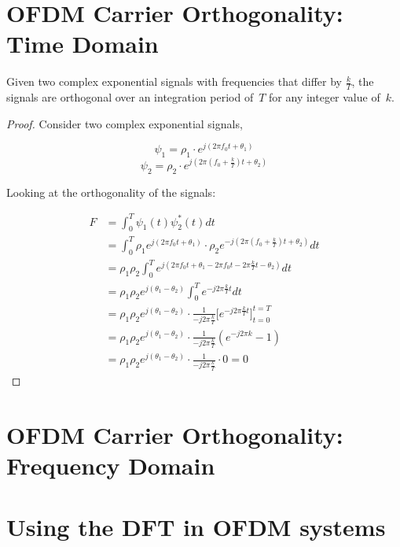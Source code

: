 \documentclass[class=report,11pt,crop=false]{standalone}
\begin{document}
\section{OFDM Carrier Orthogonality: Time Domain \label{sect:proofs_ofdm-time}}

    Given two complex exponential signals with frequencies that differ by \(\frac{k}{T}\), the signals are orthogonal over an integration period of~\(T\) for any integer value of~\(k\).

\begin{proof}
    Consider two complex exponential signals,
    
    \begin{equation}
        \psi_1 = \rho_1 \cdot e^{j(2\pi f_0 t + \theta_1)}
    \end{equation}
    \begin{equation}
        \psi_2 = \rho_2 \cdot e^{j(2\pi (f_0 + \frac{k}{T})t + \theta_2)}
    \end{equation}

    Looking at the orthogonality of the signals:
    
        \setlength{\jot}{10pt}
        \begin{align}
            F &= \int_0^T \psi_1(t) \psi_2^*(t) dt \\
            &= \int_0^T \rho_1 e^{j(2\pi f_0 t + \theta_1)} \cdot \rho_2 e^{-j(2\pi (f_0 + \frac{k}{T})t + \theta_2)} dt \\
            &= \rho_1 \rho_2 \int_0^T e^{j(2\pi f_0 t + \theta_1 - 2\pi f_0 t - 2\pi \frac{k}{T}t - \theta_2)} dt \\
            &= \rho_1 \rho_2 e^{j(\theta_1 - \theta_2)} \int_0^T e^{-j 2\pi \frac{k}{T} t} dt \\
            &= \rho_1 \rho_2 e^{j(\theta_1 - \theta_2)} \cdot \frac{1}{-j2\pi\frac{k}{T}} \bigg[ e^{-j2\pi\frac{k}{T} t} \bigg]^{t=T}_{t=0} \\
            &= \rho_1 \rho_2 e^{j(\theta_1 - \theta_2)} \cdot \frac{1}{-j2\pi\frac{k}{T}} (e^{-j2\pi k} - 1) \\
            &= \rho_1 \rho_2 e^{j(\theta_1 - \theta_2)} \cdot \frac{1}{-j2\pi\frac{k}{T}} \cdot 0 = 0
        \end{align}
    
\end{proof}


\section{OFDM Carrier Orthogonality: Frequency Domain \label{sect:proofs_ofdm-freq}}

\section{Using the DFT in OFDM systems}


\ifstandalone
% 
\fi
\end{document}

